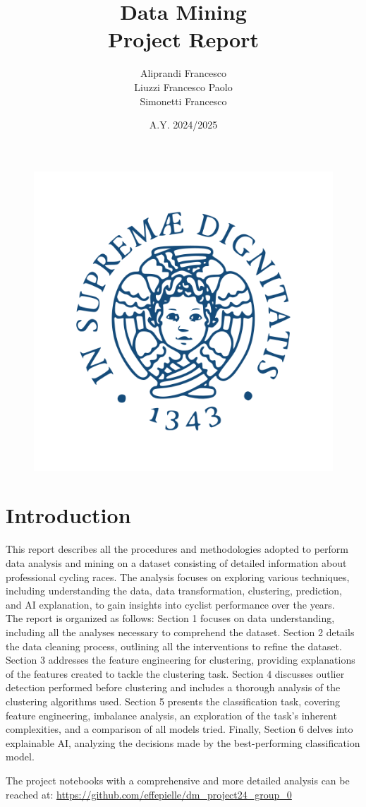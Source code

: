 \documentclass[12pt,a4paper]{article}
\title{\Huge \textbf{Data Mining \\ Project Report}}
\author{ \Large{Aliprandi Francesco} \\ \Large{Liuzzi Francesco Paolo} \\ \Large{Simonetti Francesco}}
\date{\large{A.Y. 2024/2025}}
\begin{document}
\begin{figure}
    \centering
    \includegraphics[width=0.5\linewidth]{images/unipi.png} 
\end{figure}

\maketitle

\newpage

\section*{Introduction}
This report describes all the procedures and methodologies adopted to perform data analysis and mining on a dataset consisting of detailed information about professional cycling races. The analysis focuses on exploring various techniques, including understanding the data, data transformation, clustering, prediction, and AI explanation, to gain insights into cyclist performance over the years.\\

\noindent The report is organized as follows: Section 1 focuses on data understanding, including all the analyses necessary to comprehend the dataset. Section 2 details the data cleaning process, outlining all the interventions to refine the dataset. Section 3 addresses the feature engineering for clustering, providing explanations of the features created to tackle the clustering task. 
Section 4 discusses outlier detection performed before clustering and includes a thorough analysis of the clustering algorithms used. Section 5 presents the classification task, covering feature engineering, imbalance analysis, an exploration of the task's inherent complexities, and a comparison of all models tried. Finally, Section 6 delves into explainable AI, analyzing the decisions made by the best-performing classification model.

\noindent The project notebooks with a comprehensive and more detailed analysis can be reached at: \url{https://github.com/effepielle/dm_project24_group_0}







 




\end{document}
